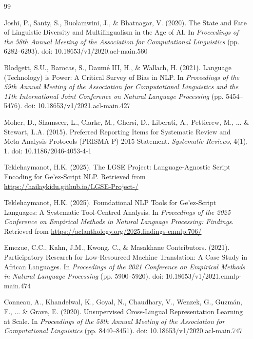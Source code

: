 \documentclass[12pt,a4paper]{article}
\theoremstyle{plain}
\theoremstyle{definition}
\begin{document}
\begin{thebibliography}{99}

Joshi, P., Santy, S., Buolamwini, J., \& Bhatnagar, V. (2020).
The State and Fate of Linguistic Diversity and Multilingualism in the Age of AI.
In \textit{Proceedings of the 58th Annual Meeting of the Association for Computational Linguistics} (pp. 6282--6293).
doi: 10.18653/v1/2020.acl-main.560

Blodgett, S.U., Barocas, S., Daumé III, H., \& Wallach, H. (2021).
Language (Technology) is Power: A Critical Survey of Bias in NLP.
In \textit{Proceedings of the 59th Annual Meeting of the Association for Computational Linguistics and the 11th International Joint Conference on Natural Language Processing} (pp. 5454--5476).
doi: 10.18653/v1/2021.acl-main.427

Moher, D., Shamseer, L., Clarke, M., Ghersi, D., Liberati, A., Petticrew, M., ... \& Stewart, L.A. (2015).
Preferred Reporting Items for Systematic Review and Meta-Analysis Protocols (PRISMA-P) 2015 Statement.
\textit{Systematic Reviews}, 4(1), 1.
doi: 10.1186/2046-4053-4-1

Teklehaymanot, H.K. (2025).
The LGSE Project: Language-Agnostic Script Encoding for Ge'ez-Script NLP.
Retrieved from \url{https://hailaykidu.github.io/LGSE-Project-/}

Teklehaymanot, H.K. (2025).
Foundational NLP Tools for Ge'ez-Script Languages: A Systematic Tool-Centred Analysis.
In \textit{Proceedings of the 2025 Conference on Empirical Methods in Natural Language Processing: Findings}.
Retrieved from \url{https://aclanthology.org/2025.findings-emnlp.706/}

Emezue, C.C., Kahn, J.M., Kwong, C., \& Masakhane Contributors. (2021).
Participatory Research for Low-Resourced Machine Translation: A Case Study in African Languages.
In \textit{Proceedings of the 2021 Conference on Empirical Methods in Natural Language Processing} (pp. 5900--5920).
doi: 10.18653/v1/2021.emnlp-main.474

Conneau, A., Khandelwal, K., Goyal, N., Chaudhary, V., Wenzek, G., Guzmán, F., ... \& Grave, E. (2020).
Unsupervised Cross-Lingual Representation Learning at Scale.
In \textit{Proceedings of the 58th Annual Meeting of the Association for Computational Linguistics} (pp. 8440--8451).
doi: 10.18653/v1/2020.acl-main.747


\end{thebibliography}
\end{document}
